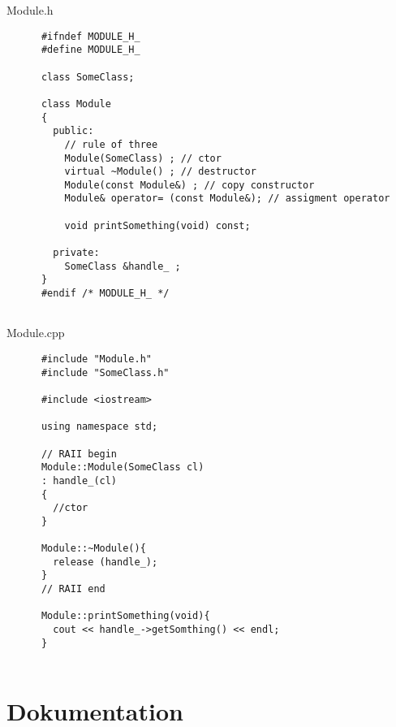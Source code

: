 \documentclass[
   draft=false
  ,paper=a4
  ,twoside=false
  ,fontsize=11pt
  ,headsepline
  ,DIV=11
  ,parskip=full+
  ,titlepage
]{scrartcl} %
\begin{document}
  \hfill
  \begin{minipage}[t]{0.5\linewidth}
    Module.h
    \begin{lstlisting}
      #ifndef MODULE_H_
      #define MODULE_H_
      
      class SomeClass;

      class Module
      {
        public:
          // rule of three
          Module(SomeClass) ; // ctor
          virtual ~Module() ; // destructor
          Module(const Module&) ; // copy constructor
          Module& operator= (const Module&); // assigment operator
        
          void printSomething(void) const;
        
        private:
          SomeClass &handle_ ;
      }
      #endif /* MODULE_H_ */
      
    \end{lstlisting}    
    Module.cpp
    \begin{lstlisting}
      #include "Module.h"
      #include "SomeClass.h"
      
      #include <iostream>
      
      using namespace std;
      
      // RAII begin
      Module::Module(SomeClass cl)
      : handle_(cl)
      {
        //ctor
      }
      
      Module::~Module(){
        release (handle_);
      }
      // RAII end
      
      Module::printSomething(void){
        cout << handle_->getSomthing() << endl;
      }
      
    \end{lstlisting}  
  \end{minipage}%

\newpage
\section{Dokumentation}
	
\end{document}
